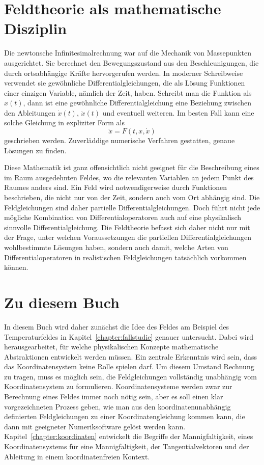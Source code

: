 \section{Feldtheorie als mathematische Disziplin}
Die newtonsche Infinitesimalrechnung war auf die Mechanik von Massepunkten
ausgerichtet.
Sie berechnet den Bewegungszustand aus den Beschleunigungen, die durch
ortsabhängige Kräfte hervorgerufen werden.
In moderner Schreibweise verwendet sie gewöhnliche Differentialgleichungen,
die als Lösung Funktionen einer einzigen Variable, nämlich der Zeit, haben.
Schreibt man die Funktion als $x(t)$, dann ist eine
gewöhnliche Differentialgleichung eine Beziehung zwischen den 
Ableitungen $\dot{x}(t)$, $\ddot{x}(t)$ und eventuell weiteren.
Im besten Fall kann eine solche Gleichung in expliziter Form als
\[
\ddot{x} = F(t, x, \dot{x})
\]
geschrieben werden.
Zuverläddige numerische Verfahren gestatten, genaue Lösungen zu finden.

Diese Mathematik ist ganz offensichtlich nicht geeignet für die
Beschreibung eines im Raum ausgedehnten Feldes, wo die relevanten
Variablen an jedem Punkt des Raumes anders sind.
Ein Feld wird notwendigerweise durch Funktionen beschrieben, die nicht
nur von der Zeit, sondern auch vom Ort abhängig sind.
Die Feldgleichungen sind daher partielle Differentialgleichungen.
Doch führt nicht jede mögliche Kombination von Differentialoperatoren
auch auf eine physikalisch sinnvolle Differentialgleichung.
Die Feldtheorie befasst sich daher nicht nur mit der Frage, unter
welchen Voraussetzungen die partiellen Differentialgleichungen
wohlbestimmte Lösungen haben, sondern auch damit, welche Arten von
Differentialoperatoren in realistischen Feldgleichungen tatsächlich
vorkommen können.

\section{Zu diesem Buch}
In diesem Buch wird daher zunächst die Idee des Feldes am 
Beispiel des Temperaturfeldes in Kapitel~\ref{chapter:fallstudie}
genauer untersucht.
Dabei wird herausgearbeitet, für welche physikalischen Konzepte
mathematische Abstraktionen entwickelt werden müssen.
Ein zentrale Erkenntnis wird sein, dass das Koordinatensystem keine
Rolle spielen darf.
Um diesem Umstand Rechnung zu tragen, muss es möglich sein, die
Feldgleichungen vollständig unabhängig vom Koordinatensystem
zu formulieren.
Koordinatensysteme werden zwar zur Berechnung eines Feldes immer
noch nötig sein, aber es soll einen klar vorgezeichneten Prozess
geben, wie man aus den koordinatenunabhängig definierten Feldgleichungen
zu einer Koordinatengleichung kommen kann, die dann mit geeigneter
Numeriksoftware gelöst werden kann.
Kapitel~\ref{chapter:koordinaten} entwickelt die Begriffe der
Mannigfaltigkeit, eines Koordinatensystems für eine Mannigfaltigkeit,
der Tangentialvektoren und der Ableitung in einem koordinatenfreien
Kontext.

